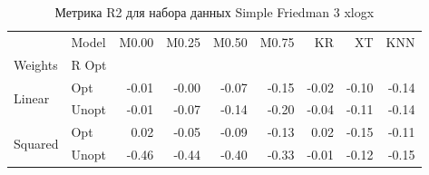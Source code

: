 \begin{table}
\caption{Метрика R2 для набора данных Simple Friedman 3 xlogx}
\label{tab:R2_Simple Friedman 3 xlogx}
\begin{tabular}{llrrrrrrr}
\toprule
 & Model & M0.00 & M0.25 & M0.50 & M0.75 & KR & XT & KNN \\
Weights & R Opt &  &  &  &  &  &  &  \\
\midrule
\multirow[t]{2}{*}{Linear} & Opt & -0.01 & -0.00 & -0.07 & -0.15 & -0.02 & -0.10 & -0.14 \\
 & Unopt & -0.01 & -0.07 & -0.14 & -0.20 & -0.04 & -0.11 & -0.14 \\

\multirow[t]{2}{*}{Squared} & Opt & 0.02 & -0.05 & -0.09 & -0.13 & 0.02 & -0.15 & -0.11 \\
 & Unopt & -0.46 & -0.44 & -0.40 & -0.33 & -0.01 & -0.12 & -0.15 \\

\bottomrule
\end{tabular}
\end{table}
